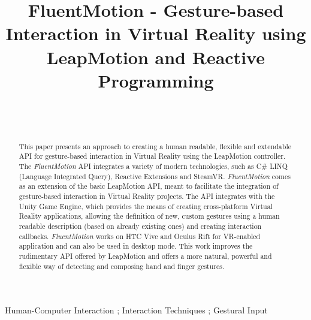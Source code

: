 \documentclass{sigchi}
\def\fluentmotion{\textit{FluentMotion}}
\def\rx{Reactive Extensions}
\def\unity{Unity Game Engine}
\def\leap{LeapMotion}
\def\vr{Virtual Reality}
\def\steamvr{SteamVR}
\def\vive{HTC Vive}
\def\oculus{Oculus Rift}
\begin{document}

\title{FluentMotion - Gesture-based Interaction in Virtual Reality using LeapMotion and Reactive Programming}

\author{
  \\
  \\
}

\maketitle

\begin{abstract}
  This paper presents an approach to creating a human readable, flexible and extendable API for gesture-based interaction in Virtual Reality using the \leap{} controller. The \fluentmotion{} API integrates a variety of modern technologies, such as C\# LINQ (Language Integrated Query), \rx{} and \steamvr{}. \fluentmotion{} comes as an extension of the basic \leap{} API, meant to facilitate the integration of gesture-based interaction in Virtual Reality projects. The API integrates with the \unity{}, which provides the means of creating cross-platform \vr{} applications, allowing the definition of new, custom gestures using a human readable description (based on already existing ones) and creating interaction callbacks. \fluentmotion{} works on \vive{} and \oculus{} for VR-enabled application and can also be used in desktop mode. This work improves the rudimentary API offered by \leap{} and offers a more natural, powerful and flexible way of detecting and composing hand and finger gestures.
\end{abstract}


 {Human-Computer Interaction} ; {Interaction Techniques} ; {Gestural Input}
\end{document}
